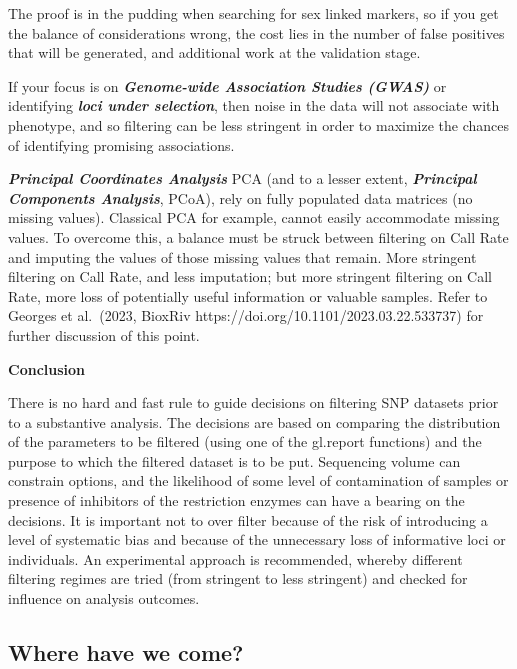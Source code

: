 \documentclass[
  letterpaper,
  DIV=11,
  numbers=noendperiod]{scrreprt}
\begin{document}
The proof is in the pudding when searching for sex linked markers, so if
you get the balance of considerations wrong, the cost lies in the number
of false positives that will be generated, and additional work at the
validation stage.

If your focus is on \textbf{\emph{Genome-wide Association Studies
(GWAS)}} or identifying \textbf{\emph{loci under selection}}, then noise
in the data will not associate with phenotype, and so filtering can be
less stringent in order to maximize the chances of identifying promising
associations.

\textbf{\emph{Principal Coordinates Analysis}} PCA (and to a lesser
extent, \textbf{\emph{Principal Components Analysis}}, PCoA), rely on
fully populated data matrices (no missing values). Classical PCA for
example, cannot easily accommodate missing values. To overcome this, a
balance must be struck between filtering on Call Rate and imputing the
values of those missing values that remain. More stringent filtering on
Call Rate, and less imputation; but more stringent filtering on Call
Rate, more loss of potentially useful information or valuable samples.
Refer to Georges et al.~(2023, BioxRiv
https://doi.org/10.1101/2023.03.22.533737) for further discussion of
this point.

\textbf{Conclusion}

There is no hard and fast rule to guide decisions on filtering SNP
datasets prior to a substantive analysis. The decisions are based on
comparing the distribution of the parameters to be filtered (using one
of the gl.report functions) and the purpose to which the filtered
dataset is to be put. Sequencing volume can constrain options, and the
likelihood of some level of contamination of samples or presence of
inhibitors of the restriction enzymes can have a bearing on the
decisions. It is important not to over filter because of the risk of
introducing a level of systematic bias and because of the unnecessary
loss of informative loci or individuals. An experimental approach is
recommended, whereby different filtering regimes are tried (from
stringent to less stringent) and checked for influence on analysis
outcomes.

\hypertarget{where-have-we-come-1}{%
\subsection*{Where have we come?}\label{where-have-we-come-1}}
\end{document}
